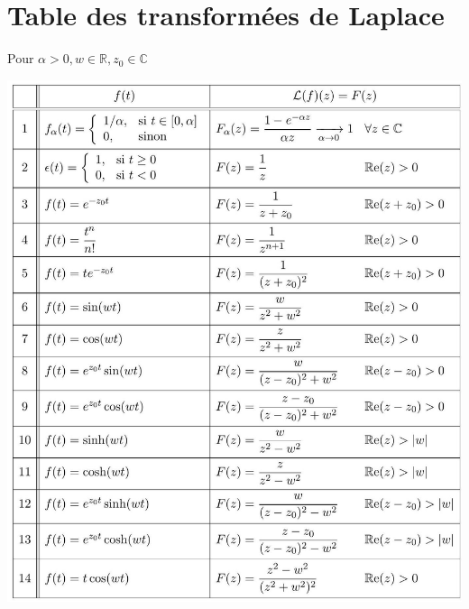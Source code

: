\section{Table des transformées de Laplace}
Pour $\alpha>0, w \in \mathbb{R}, z_{0} \in \mathbb{C}$
\begin{center}
\includegraphics[max width=\textwidth]{images/Table_Laplace.jpg}
\end{center}